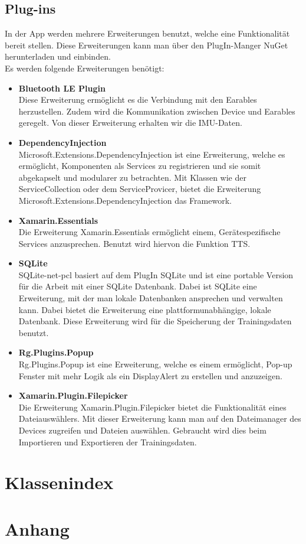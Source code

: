 \documentclass[a4paper,12pt]{article}
\begin{document}
\subsection{Plug-ins}
In der App werden mehrere Erweiterungen benutzt, welche eine Funktionalität bereit stellen. Diese Erweiterungen kann man über den PlugIn-Manger \Gls{NuGet} herunterladen und einbinden. \\
Es werden folgende Erweiterungen benötigt:\\
\begin{itemize}
	\item \textbf{\Gls{Bluetooth LE Plugin}}\\Diese Erweiterung ermöglicht es die Verbindung mit den \Gls{Earables} herzustellen. Zudem wird die Kommunikation zwischen Device und \Gls{Earables} geregelt. Von dieser Erweiterung erhalten wir die \Gls{IMU}-Daten.
	\item \textbf{\Gls{DependencyInjection}}\\Microsoft.Extensions.DependencyInjection ist eine Erweiterung, welche es ermöglicht, Komponenten als Services zu registrieren und sie somit abgekapselt und modularer zu betrachten. Mit Klassen wie der ServiceCollection oder dem ServiceProvicer, bietet die Erweiterung Microsoft.Extensions.DependencyInjection das Framework.
	\item \textbf{\Gls{Xamarin.Essentials}}\\Die Erweiterung Xamarin.Essentials ermöglicht einem, Gerätespezifische Services anzusprechen. Benutzt wird hiervon die Funktion \Gls{TTS}. 
	\item \textbf{\Gls{SQLite}}\\SQLite-net-pcl basiert auf dem PlugIn SQLite und ist eine portable Version für die Arbeit mit einer SQLite Datenbank. Dabei ist SQLite eine Erweiterung, mit der man lokale Datenbanken ansprechen und verwalten kann. Dabei bietet die Erweiterung eine plattformunabhängige, lokale Datenbank. Diese Erweiterung wird für die Speicherung der Trainingsdaten benutzt.
	\item \textbf{\Gls{Rg.Plugins.Popup}}\\Rg.Plugins.Popup ist eine Erweiterung, welche es einem ermöglicht, Pop-up Fenster mit mehr Logik als ein DisplayAlert zu erstellen und anzuzeigen.
	\item \textbf{\Gls{Xamarin.Plugin.Filepicker}}\\Die Erweiterung Xamarin.Plugin.Filepicker bietet die Funktionalität eines Dateiauswählers. Mit dieser Erweiterung kann man auf den Dateimanager des Devices zugreifen und Dateien auswählen. Gebraucht wird dies beim Importieren und Exportieren der Trainingsdaten.
\end{itemize}

\section{Klassenindex}

\section{Anhang}

\clearpage

\printglossaries
{}
\end{document}
